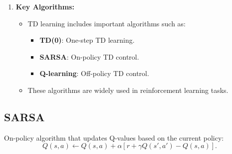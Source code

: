 \documentclass[12pt,a4paper]{article}
\begin{document}
\begin{enumerate}
    \item \textbf{Key Algorithms:}
    \begin{itemize}
        \item TD learning includes important algorithms such as:
        \begin{itemize}
            \item \textbf{TD(0)}: One-step TD learning.
            \item \textbf{SARSA}: On-policy TD control.
            \item \textbf{Q-learning}: Off-policy TD control.
        \end{itemize}
        \item These algorithms are widely used in reinforcement learning tasks.
    \end{itemize}
\end{enumerate}
\subsection{SARSA} On-policy algorithm that updates Q-values based on the current policy:
    \[ Q(s, a) \leftarrow Q(s, a) + \alpha \left[ r + \gamma Q(s', a') - Q(s, a) \right]. \]
\end{document}
